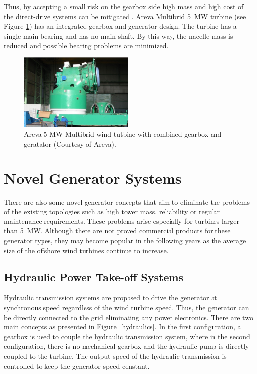\documentclass[a4paper, 11pt]{article} %
\begin{document}
Thus, by accepting a small risk on the gearbox side high mass and high cost of the direct-drive systems can be mitigated \cite{Bohmeke2003}. Areva Multibrid 5~MW  turbine (see Figure \ref{multibrid}) has an integrated gearbox and generator design. The turbine has a single main bearing and has no main shaft. By this way, the nacelle mass is reduced and possible bearing problems are minimized. 

  \begin{figure}
    \centering
    \includegraphics[width=0.5\textwidth]{multibrid}
    \caption{Areva 5 MW Multibrid wind tutbine with combined gearbox and geratator (Courtesy of Areva).} 
    \label{multibrid}
  \end{figure}

\section{Novel Generator Systems}

There are also some novel generator concepts that aim to eliminate the problems of the existing topologies such as high tower mass, reliability or regular maintenance requirements. These problems arise especially for turbines larger than 5~MW. Although there are not proved commercial products for these generator types, they may become popular in the following years as the average size of the offshore wind turbines continue to increase.

\subsection{Hydraulic Power Take-off Systems}

Hydraulic transmission systems are proposed to drive the generator at synchronous speed regardless of the wind turbine speed. Thus, the generator can be directly connected to the grid eliminating any power electronics. There are two main concepts as presented in Figure~\ref{hydraulics}. In the first configuration, a gearbox is used to couple the hydraulic transmission system, where in the second configuration, there is no mechanical gearbox and the hydraulic pump is directly coupled to the turbine. The output speed of the hydraulic transmission is controlled to keep the generator speed constant.
\end{document}

